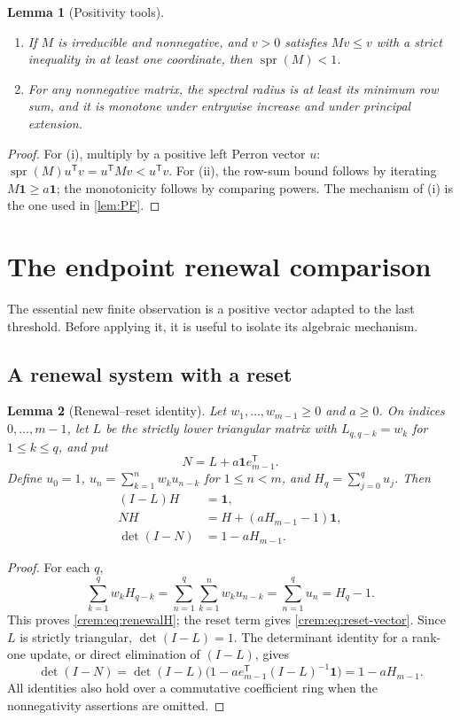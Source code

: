 \documentclass[11pt,a4paper]{article}
\newtheorem{lemma}[lemma]{Lemma}
\theoremstyle{definition}\newaliascnt{definition}{theorem}
\theoremstyle{remark}\newaliascnt{remark}{theorem}
\newcommand{\spr}{\operatorname{spr}}
\newcommand{\one}{\mathbf 1}
\begin{document}
\begin{lemma}[Positivity tools]\label{crem:lem:positivity}
\begin{enumerate}[label=(\roman*)]
\item If $M$ is irreducible and nonnegative, and $v>0$ satisfies $Mv\le v$
 with a strict inequality in at least one coordinate, then $\spr(M)<1$.
\item For any nonnegative matrix, the spectral radius is at least its
 minimum row sum, and it is monotone under entrywise increase and under
 principal extension.
\end{enumerate}
\end{lemma}
\begin{proof}
For (i), multiply by a positive left Perron vector $u$:
$\spr(M)u^{\mathsf T}v=u^{\mathsf T}Mv<u^{\mathsf T}v$. For (ii), the
row-sum bound follows by iterating $M\one\ge a\one$; the monotonicity
follows by comparing powers. The mechanism of (i) is the one used in
\cref{lem:PF}.
\end{proof}

\section{The endpoint renewal comparison}
\label{crem:sec:renewal}
The essential new finite observation is a positive vector adapted to the
last threshold. Before applying it, it is useful to isolate its algebraic
mechanism.

\subsection{A renewal system with a reset}
\begin{lemma}[Renewal--reset identity]\label{crem:lem:reset}
Let $w_1,\ldots,w_{m-1}\ge0$ and $a\ge0$. On indices $0,\ldots,m-1$, let
$L$ be the strictly lower triangular matrix with $L_{q,q-k}=w_k$ for
$1\le k\le q$, and put
\[
 N=L+a\one e_{m-1}^{\mathsf T}.
\]
Define $u_0=1$, $u_n=\sum_{k=1}^n w_ku_{n-k}$ for $1\le n<m$, and
$H_q=\sum_{j=0}^q u_j$. Then
\begin{align}
 (I-L)H&=\one,\label{crem:eq:renewalH}\\
 NH&=H+(aH_{m-1}-1)\one,\label{crem:eq:reset-vector}\\
 \det(I-N)&=1-aH_{m-1}.\label{crem:eq:reset-det}
\end{align}
\end{lemma}
\begin{proof}
For each $q$,
\[
 \sum_{k=1}^q w_kH_{q-k}
 =\sum_{n=1}^q\sum_{k=1}^n w_ku_{n-k}
 =\sum_{n=1}^q u_n=H_q-1.
\]
This proves \eqref{crem:eq:renewalH}; the reset term gives
\eqref{crem:eq:reset-vector}. Since $L$ is strictly triangular,
$\det(I-L)=1$. The determinant identity for a rank-one update, or direct
elimination of $(I-L)$, gives
\[
 \det(I-N)=\det(I-L)
 \bigl(1-ae_{m-1}^{\mathsf T}(I-L)^{-1}\one\bigr)
 =1-aH_{m-1}.
\]
All identities also hold over a commutative coefficient ring when the
nonnegativity assertions are omitted.
\end{proof}
\end{document}
